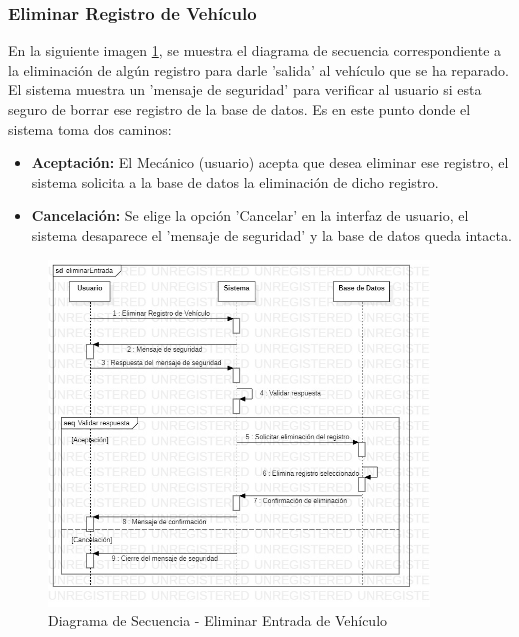 \subsubsection{Eliminar Registro de Vehículo}
En la siguiente imagen \ref{fig:Diagrama de Secuencia - Eliminar Entrada de Vehículo}, se muestra el diagrama de secuencia correspondiente a la eliminación de algún registro para darle 'salida' al vehículo que se ha reparado. El sistema muestra un 'mensaje de seguridad' para verificar al usuario si esta seguro de borrar ese registro de la base de datos. Es en este punto donde el sistema toma dos caminos:
\begin{itemize}
	\item \textbf{Aceptación:} El Mecánico (usuario) acepta que desea eliminar ese registro, el sistema solicita a la base de datos la eliminación de dicho registro.
	\item \textbf{Cancelación:} Se elige la opción 'Cancelar' en la interfaz de usuario, el sistema desaparece el 'mensaje de seguridad' y la base de datos queda intacta. 
\end{itemize}
\begin{figure}[!h]
	\centering
	\includegraphics[width=0.9\textwidth]{./diseno/vprocesos/imagenes/eliminarEntrada}
	\caption{Diagrama de Secuencia - Eliminar Entrada de Vehículo}
	\label{fig:Diagrama de Secuencia - Eliminar Entrada de Vehículo}
\end{figure}
\clearpage